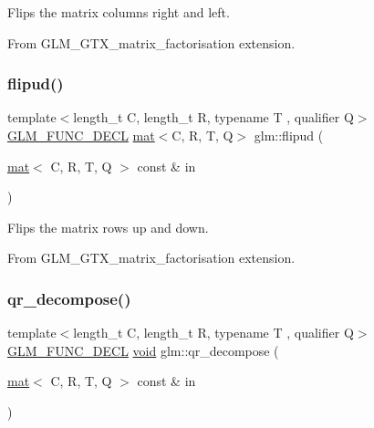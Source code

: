 Flips the matrix columns right and left.

From G\+L\+M\+\_\+\+G\+T\+X\+\_\+matrix\+\_\+factorisation extension. \mbox{\label{group__gtx__matrix__factorisation_ga85003371f0ba97380dd25e8905de1870}} 
\subsubsection{\texorpdfstring{flipud()}{flipud()}}
{\footnotesize\ttfamily template$<$length\+\_\+t C, length\+\_\+t R, typename T , qualifier Q$>$ \\
\mbox{\hyperlink{setup_8hpp_ab2d052de21a70539923e9bcbf6e83a51}{G\+L\+M\+\_\+\+F\+U\+N\+C\+\_\+\+D\+E\+CL}} \mbox{\hyperlink{structglm_1_1mat}{mat}}$<$C, R, T, Q$>$ glm\+::flipud (\begin{DoxyParamCaption}\item[{\mbox{\hyperlink{structglm_1_1mat}{mat}}$<$ C, R, T, Q $>$ const \&}]{in }\end{DoxyParamCaption})}

Flips the matrix rows up and down.

From G\+L\+M\+\_\+\+G\+T\+X\+\_\+matrix\+\_\+factorisation extension. \mbox{\label{group__gtx__matrix__factorisation_ga77022dca1aa38add548f9f56a9f8071a}} 
\subsubsection{\texorpdfstring{qr\+\_\+decompose()}{qr\_decompose()}}
{\footnotesize\ttfamily template$<$length\+\_\+t C, length\+\_\+t R, typename T , qualifier Q$>$ \\
\mbox{\hyperlink{setup_8hpp_ab2d052de21a70539923e9bcbf6e83a51}{G\+L\+M\+\_\+\+F\+U\+N\+C\+\_\+\+D\+E\+CL}} \mbox{\hyperlink{_s_d_l__opengles2__gl2ext_8h_ae5d8fa23ad07c48bb609509eae494c95}{void}} glm\+::qr\+\_\+decompose (\begin{DoxyParamCaption}\item[{\mbox{\hyperlink{structglm_1_1mat}{mat}}$<$ C, R, T, Q $>$ const \&}]{in }\end{DoxyParamCaption})}


